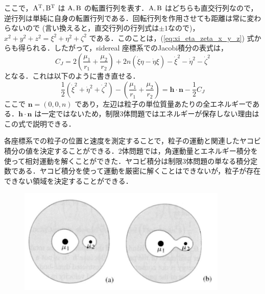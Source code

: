 \documentclass[11pt,a4paper,oneside,onecolumn]{jarticle}
\begin{document}
ここで，${\rm A}^{\rm T}, {\rm B}^{\rm T}$ は ${\rm A}, {\rm B}$ の転置行列を表す．${\rm A}, {\rm B}$ はどちらも直交行列なので，逆行列は単純に自身の転置行列である．回転行列を作用させても距離は常に変わらないので (言い換えると，直交行列の行列式は$\pm 1$なので)，$x^2 + y^2 + z^2 = \xi^2 + \eta^2 + \zeta^2$ である．このことは，(\ref{eq:xi_eta_zeta_x_y_z}) 式からも得られる．したがって，sidereal 座標系でのJacobi積分の表式は，
\begin{equation}
C_J = 2 \left( \frac{\mu_1}{r_1} + \frac{\mu_2}{r_2} \right) + 2 n (\dot{\xi} \eta - \dot{\eta} \xi) - \dot{\xi}^2 - \dot{\eta}^2 - \dot{\zeta}^2 \label{eq:C_J}
\end{equation}
となる．これは以下のように書き直せる．
\begin{equation}
 \frac{1}{2} (\dot{\xi}^2 + \dot{\eta}^2 + \dot{\zeta}^2) - \left( \frac{\mu_1}{r_1} + \frac{\mu_2}{r_2} \right) = {\bm h} \cdot {\bm n} - \frac{1}{2} C_J
\end{equation}
ここで ${\bm n} = (0, 0, n)$ であり，左辺は粒子の単位質量あたりの全エネルギーである．${\bm h} \cdot {\bm n}$ は一定ではないため，制限3体問題ではエネルギーが保存しない理由はこの式で説明できる．

各座標系での粒子の位置と速度を測定することで，粒子の運動と関連したヤコビ積分の値を決定することができる．2体問題では，角運動量とエネルギー積分を使って相対運動を解くことができた．ヤコビ積分は制限3体問題の単なる積分定数である．ヤコビ積分を使って運動を厳密に解くことはできないが，粒子が存在できない領域を決定することができる．

\begin{figure}[H]
\centering
\includegraphics[width=10cm]{./image/sec3_2.pdf}
\caption{\label{fig:zerovelo}}
\end{figure}
\end{document}
